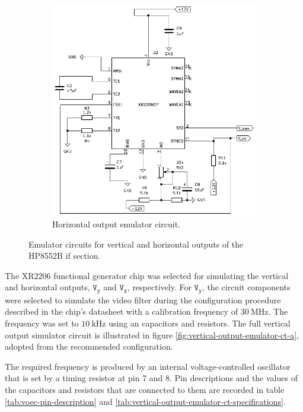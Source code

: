 \documentclass[class=report,11pt,crop=false]{standalone}
\begin{document}
\begin{figure}[h!]
\begin{subfigure}{.5\textwidth}
			\includegraphics[width=.8\linewidth]{Figures/Methodology/hp8552b-horizontal-output-emulator-3}
			\caption{Horizontal output emulator circuit.}
			\label{fig:horizontal-output-emulator-ct-a}
		\end{subfigure}
		\caption{Emulator circuits for vertical and horizontal outputs of the HP8552B \acrshort{if} section.}
		\label{fig:hp8552B-vh-emulator}
	\end{figure}
	
	The XR2206 functional generator chip was selected for simulating the vertical and horizontal outputs, $\texttt{V}_\texttt{y}$ and $\texttt{V}_\texttt{x}$, respectively. For $\texttt{V}_\texttt{y}$, the circuit components were selected to simulate the video filter during the configuration procedure described in the chip's datasheet with a calibration frequency of $\SI{30}{\mega\hertz}$. The frequency was set to $\SI{10}{\kilo\hertz}$ using an capacitors and resistors. The full vertical output simulator circuit is illustrated in figure \ref{fig:vertical-output-emulator-ct-a}, adopted from the recommended configuration. 
		
	The required frequency is produced by an internal voltage-controlled oscillator that is set by a timing resistor at pin 7 and 8. Pin descriptions and the values of the capacitors and resistors that are connected to them are recorded in table \ref{tab:voec-pin-description} and \ref{tab:vertical-output-emulator-ct-specifications}.
	
\end{document}
